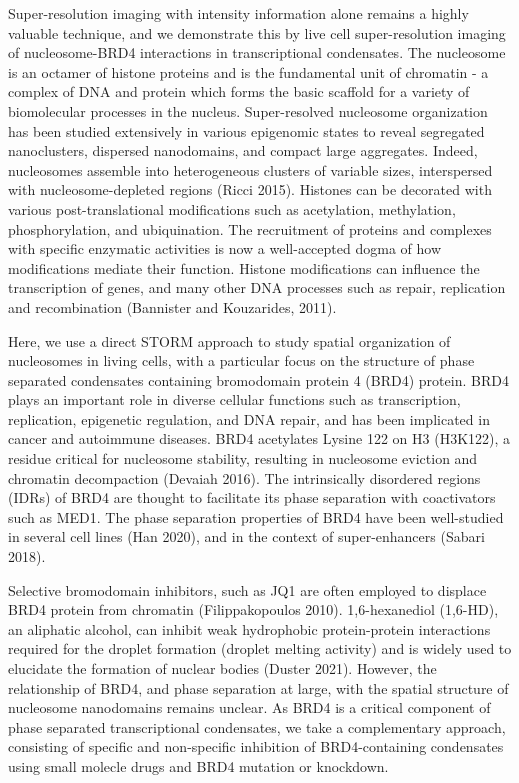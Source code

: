 \documentclass{ucetd}
\begin{document}
Super-resolution imaging with intensity information alone remains a highly valuable technique, and we demonstrate this by live cell super-resolution imaging of nucleosome-BRD4 interactions in transcriptional condensates. The nucleosome is an octamer of histone proteins and is the fundamental unit of chromatin - a complex of DNA and protein which forms the basic scaffold for a variety of biomolecular processes in the nucleus. Super-resolved nucleosome organization has been studied extensively in various epigenomic states to reveal segregated nanoclusters, dispersed nanodomains, and compact large aggregates. Indeed, nucleosomes assemble into heterogeneous clusters of variable sizes, interspersed with nucleosome-depleted regions (Ricci 2015). Histones can be decorated with various post-translational modifications such as acetylation, methylation, phosphorylation, and ubiquination. The recruitment of proteins and complexes with specific enzymatic activities is now a well-accepted dogma of how modifications mediate their function. Histone modifications can influence the transcription of genes, and many other DNA processes such as repair, replication and recombination (Bannister and Kouzarides, 2011). 

Here, we use a direct STORM approach to study spatial organization of nucleosomes in living cells, with a particular focus on the structure of phase separated condensates containing bromodomain protein 4 (BRD4) protein. BRD4 plays an important role in diverse cellular functions such as transcription, replication, epigenetic regulation, and DNA repair, and has been implicated in cancer and autoimmune diseases. BRD4 acetylates Lysine 122 on H3 (H3K122), a residue critical for nucleosome stability, resulting in nucleosome eviction and chromatin decompaction (Devaiah 2016). The intrinsically disordered regions (IDRs) of BRD4 are thought to facilitate its phase separation with coactivators such as MED1. The phase separation properties of BRD4 have been well-studied in several cell lines (Han 2020), and in the context of super-enhancers (Sabari 2018).

Selective bromodomain inhibitors, such as JQ1 are often employed to displace BRD4 protein from chromatin (Filippakopoulos 2010). 1,6-hexanediol (1,6-HD), an aliphatic alcohol, can inhibit weak hydrophobic protein-protein interactions required for the droplet formation (droplet melting activity) and is widely used to elucidate the formation of nuclear bodies (Duster 2021). However, the relationship of BRD4, and phase separation at large, with the spatial structure of nucleosome nanodomains remains unclear. As BRD4 is a critical component of phase separated transcriptional condensates, we take a complementary approach, consisting of specific and non-specific inhibition of BRD4-containing condensates using small molecle drugs and BRD4 mutation or knockdown.
\end{document}
